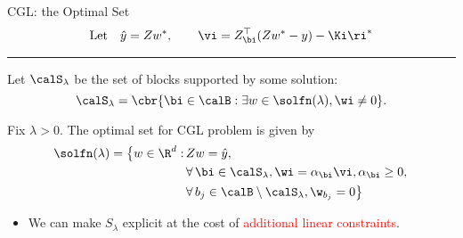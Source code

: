 \documentclass[usenames,dvipsnames,mathserif,notheorems]{beamer}
\newcommand{\horizontalrule}{
	{
			\vspace{-0.5em}
			\center \rule{\textwidth}{0.1em}
			\vspace{-0.2em}
		}
}
\newcommand{\red}[1]{\textcolor{Red}{#1}}
\begin{document}
\begin{frame}{CGL: the Optimal Set}
	\vspace{-2ex}
	\begin{align*}
		\text{Let} \quad \hat y = Z w^*, \quad \quad \vi = Z_\bi^\top (Z w^* - y) - \Ki \ri^*
	\end{align*}
	\vspace{-2ex}
	\pause
	\horizontalrule
	\vspace{-1ex}

	Let \( \calS_\lambda \) be the set of blocks supported by some solution:
	\[
		\calS_\lambda = \cbr{\bi \in \calB : \exists w \in \solfn(\lambda), \wi \neq 0}.
	\]

	\pause

	\begin{proposition}[Informal]
		Fix \( \lambda > 0 \).
		The optimal set for CGL problem is
		given by
		\begin{equation*}
			\begin{aligned}
				\solfn(\lambda) =
				\big\{  w  \in  \R^d : \, & Z w = \hat y,                                     \\
				                          & \forall \, \bi  \in  \calS_\lambda,
				\wi =  \alpha_\bi \vi, \alpha_\bi \geq 0, \,                                  \\
				                          & \forall \, b_j \in \calB \setminus \calS_\lambda,
				\w_{b_j} = 0
				\big\}
			\end{aligned}
		\end{equation*}

	\end{proposition}

	\pause
	\begin{itemize}
		\item We can make \( S_\lambda \) explicit at the cost of
		      \red{additional linear constraints}.
	\end{itemize}

\end{frame}
\end{document}
